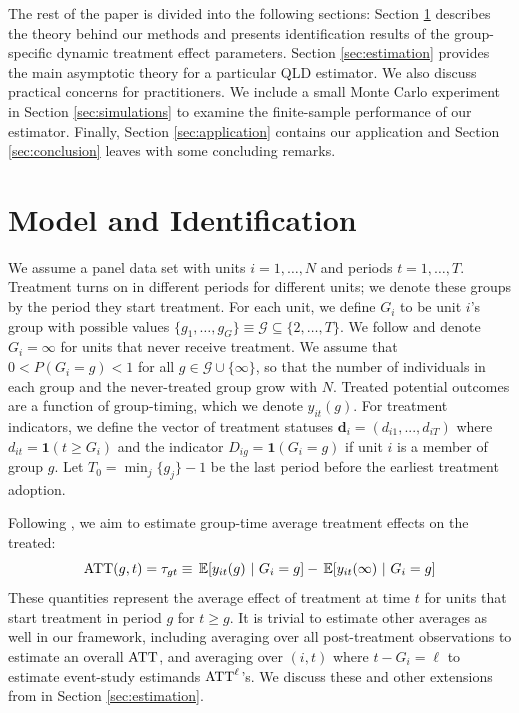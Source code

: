 The rest of the paper is divided into the following sections: Section \ref{sec:theory} describes the theory behind our methods and presents identification results of the group-specific dynamic treatment effect parameters. Section \ref{sec:estimation} provides the main asymptotic theory for a particular QLD estimator. We also discuss practical concerns for practitioners. We include a small Monte Carlo experiment in Section \ref{sec:simulations} to examine the finite-sample performance of our estimator. Finally, Section \ref{sec:application} contains our application and Section \ref{sec:conclusion} leaves with some concluding remarks. 


\section{Model and Identification} \label{sec:theory}

We assume a panel data set with units $i = 1,\dots, N$ and periods $t = 1, \dots, T$. Treatment turns on in different periods for different units; we denote these groups by the period they start treatment. For each unit, we define $G_i$ to be unit $i$'s group with possible values $\{ g_1, \dots, g_G \} \equiv \mathcal{G} \subseteq \{ 2, \dots, T \}$. We follow \citet{Callaway_Santanna_2021} and denote $G_i = \infty$ for units that never receive treatment. We assume that $0 < P(G_i = g) < 1$ for all $g \in \mathcal{G} \cup \{ \infty \}$, so that the number of individuals in each group and the never-treated group grow with $N$. Treated potential outcomes are a function of group-timing, which we denote $y_{it}(g)$. For treatment indicators, we define the vector of treatment statuses $\bm d_{i} = (d_{i1},...,d_{iT})$ where $d_{it} = \mathbf{1}(t \geq G_i)$ and the indicator $D_{ig} = \mathbf{1}(G_i = g)$ if unit $i$ is a member of group $g$. Let $T_0 = \min_j \{ g_j \} - 1$ be the last period before the earliest treatment adoption. 


Following \citet{Callaway_Santanna_2021}, we aim to estimate group-time average treatment effects on the treated:
\begin{equation}
  \ATT(g,t) = \tau_{gt} \equiv \expec{y_{it}(g)}{G_i = g} - \expec{y_{it}(\infty)}{G_i = g}
\end{equation}
These quantities represent the average effect of treatment at time $t$ for units that start treatment in period $g$ for $t \geq g$. It is trivial to estimate other averages as well in our framework, including averaging over all post-treatment observations to estimate an overall $\text{ATT}$, and averaging over $(i,t)$ where $t - G_i = \ell$ to estimate event-study estimands $\text{ATT}^\ell$'s. We discuss these and other extensions from \citet{Callaway_Santanna_2021} in Section \ref{sec:estimation}.

